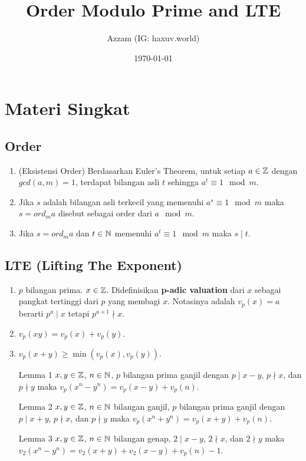 \documentclass[11pt]{scrartcl}
\title{Order Modulo Prime and LTE}
\author{Azzam (IG: haxuv.world)}
\date{\today}
\begin{document}
\maketitle

\section{Materi Singkat}
\subsection{Order}
\begin{enumerate}
    \item (Eksistensi Order) Berdasarkan Euler's Theorem, untuk setiap $a \in \mathbb Z$ dengan $gcd(a,m)=1$, terdapat bilangan asli $t$ sehingga $a^t \equiv 1 \mod m$.
    \item Jika $s$ adalah bilangan asli terkecil yang memenuhi $a^s \equiv 1 \mod m$ maka $s = ord_m a$ disebut sebagai order dari $a \mod m$.
    \item Jika $s = ord_m a$ dan $t \in \mathbb N$ memenuhi $a^t \equiv 1 \mod m$ maka $s \mid t$.
\end{enumerate}

\subsection{LTE (Lifting The Exponent)}
\begin{enumerate}
    \item $p$ bilangan prima. $x \in \mathbb Z$. Didefinisikan \textbf{p-adic valuation} dari $x$ sebagai pangkat tertinggi dari $p$ yang membagi $x$. Notasinya adalah $v_p(x)=a$ berarti $p^a \mid x$ tetapi $p^{a+1} \nmid x$.
    \item $v_p(xy) = v_p(x) + v_p(y)$.
    \item $v_p(x+y) \ge \min(v_p(x),v_p(y))$.
    \item [Lemma 1] $x,y \in \mathbb Z$, $n \in \mathbb N$, $p$ bilangan prima ganjil dengan $p \mid x-y$, $p \nmid x$, dan $p \nmid y$ maka $v_p(x^n-y^n)=v_p(x-y)+v_p(n)$.
    \item [Lemma 2] $x,y \in \mathbb Z$, $n \in \mathbb N$ bilangan ganjil, $p$ bilangan prima ganjil dengan $p \mid x+y$, $p \nmid x$, dan $p \nmid y$ maka $v_p(x^n+y^n)=v_p(x+y)+v_p(n)$.
    \item [Lemma 3] $x,y \in \mathbb Z$, $n \in \mathbb N$ bilangan genap,  $2 \mid x-y$, $2 \nmid x$, dan $2 \nmid y$ maka $v_2(x^n-y^n)=v_2(x+y)+v_2(x-y)+v_p(n)-1$.
    
\end{enumerate}
\end{document}
